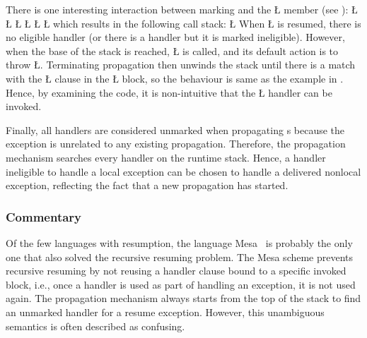 \documentclass[openright,twoside]{report}
\begin{document}
There is one interesting interaction between marking and the \LGinlinetrue\LGbegin\lgrinde\L{}\endlgrinde\LGend{} member (see ):
\LGinlinefalse\LGbegin\lgrinde
\L{}
\L{}
\L{\LB{}}
\L{\LB{}}
\CE{}\L{\LB{}}
\L{\LB{\}}}
\endlgrinde\LGend
which results in the following call stack:
\LGinlinefalse\LGbegin\lgrinde
\L{}
\endlgrinde\LGend
When \LGinlinetrue\LGbegin\lgrinde\L{}\endlgrinde\LGend{} is resumed, there is no eligible handler (or there is a handler but it is marked ineligible).
However, when the base of the stack is reached, \LGinlinetrue\LGbegin\lgrinde\L{}\endlgrinde\LGend{} is called, and its default action is to throw \LGinlinetrue\LGbegin\lgrinde\L{}\endlgrinde\LGend{}.
Terminating propagation then unwinds the stack until there is a match with the \LGinlinetrue\LGbegin\lgrinde\L{}\endlgrinde\LGend{} clause in the \LGinlinetrue\LGbegin\lgrinde\L{}\endlgrinde\LGend{} block, so the behaviour is same as the example in .
Hence, by examining the code, it is non-intuitive that the \LGinlinetrue\LGbegin\lgrinde\L{}\endlgrinde\LGend{} handler can be invoked.

Finally, all handlers are considered unmarked when propagating s because the exception is unrelated to any existing propagation.
Therefore, the propagation mechanism searches every handler on the runtime stack.
Hence, a handler ineligible to handle a local exception can be chosen to handle a delivered nonlocal exception, reflecting the fact that a new propagation has started.


\subsubsection{Commentary}

Of the few languages with resumption, the language Mesa~\cite{Mesa} is probably the only one that also solved the recursive resuming problem.
The Mesa scheme prevents recursive resuming by not reusing a handler clause bound to a specific invoked block, i.e., once a handler is used as part of handling an exception, it is not used again.
The propagation mechanism always starts from the top of the stack to find an unmarked handler for a resume exception.
However, this unambiguous semantics is often described as confusing.
\end{document}

